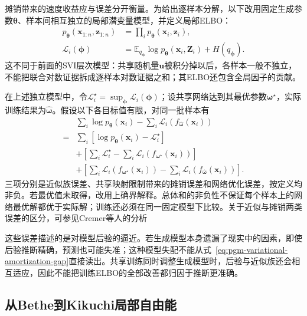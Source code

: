 摊销带来的速度收益应与误差分开衡量。为给出逐样本分解，以下改用固定生成参数$\bm\theta$、样本间相互独立的局部潜变量模型，并定义局部ELBO：
\[
  \begin{aligned}
    p_{\bm\theta}(\bm x_{1:n},\bm z_{1:n})
      &=\prod_i p_{\bm\theta}(\bm x_i,\bm z_i),\\
    \mathcal L_i(\bm\phi)
      &=\mathbb E_{q_{\bm\phi}}
          \log p_{\bm\theta}(\bm x_i,\bm Z_i)+H(q_{\bm\phi}).
  \end{aligned}
\]
这不同于前面的SVI层次模型：共享随机量$\bm u$被积分掉以后，各样本一般不独立，不能把联合对数证据拆成逐样本对数证据之和；其ELBO还包含全局因子的贡献。

在上述独立模型中，令$\mathcal L_i^\star=\sup_{\bm{\phi}}\mathcal L_i(\bm{\phi})$；设共享网络达到其最优参数$\bm{\omega}^\star$，实际训练结果为$\widehat{\bm{\omega}}$。假设以下各目标值有限，对同一批样本有
\begin{equation}
  \begin{aligned}
    &\sum_i\log p_{\bm\theta}(\bm x_i)
       -\sum_i\mathcal L_i(f_{\widehat{\bm{\omega}}}(\bm x_i))\\
    ={}&\sum_i[\log p_{\bm\theta}(\bm x_i)-\mathcal L_i^\star]\\
     &+\left[\sum_i\mathcal L_i^\star
          -\sum_i\mathcal L_i(f_{\bm{\omega}^\star}(\bm x_i))\right]\\
     &+\left[\sum_i\mathcal L_i(f_{\bm{\omega}^\star}(\bm x_i))
          -\sum_i\mathcal L_i(f_{\widehat{\bm{\omega}}}(\bm x_i))\right].
  \end{aligned}
  \label{eq:pgm-variational-amortization-gap}
\end{equation}
三项分别是近似族误差、共享映射限制带来的摊销误差和网络优化误差，按定义均非负。若最优值未取得，改用上确界解释。总体和的非负性不保证每个样本上的网络最优解都优于实际解；训练还必须在同一固定模型下比较。关于近似与摊销两类误差的区分，可参见Cremer等人的分析

这些误差描述的是对模型后验的逼近。若生成模型本身遗漏了现实中的因素，即使后验推断精确，预测也可能失准；这种模型失配不能从式~\eqref{eq:pgm-variational-amortization-gap}直接读出。共享训练同时调整生成模型时，后验与近似族还会相互适应，因此不能把训练ELBO的全部改善都归因于推断更准确。

\subsection{从Bethe到Kikuchi局部自由能}
\label{sec:pgm-variational-bethe-kikuchi}
\label{sec:pgm-variational-local-free-energy}
\label{sec:pgm-variational-bethe}

